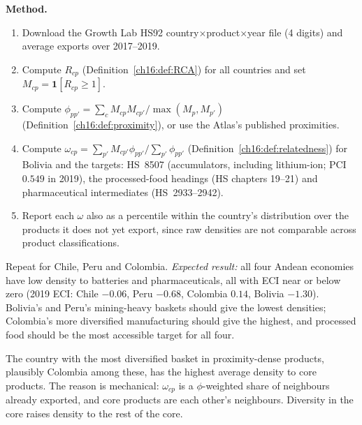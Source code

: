 \documentclass[../solutions_manual.tex]{subfiles}
\begin{document}
 \textbf{Method.}
\begin{enumerate}
\item Download the Growth Lab HS92 country$\times$product$\times$year file (4 digits) and average exports over 2017--2019.
\item Compute $R_{cp}$ (Definition~\ref{ch16:def:RCA}) for all countries and set $M_{cp} = \mathbf{1}[R_{cp} \ge 1]$.
\item Compute $\phi_{pp'} = \sum_c M_{cp}M_{cp'}/\max(M_p, M_{p'})$ (Definition~\ref{ch16:def:proximity}), or use the Atlas's published proximities.
\item Compute $\omega_{cp} = \sum_{p'}M_{cp'}\phi_{pp'}/\sum_{p'}\phi_{pp'}$ (Definition~\ref{ch16:def:relatedness}) for Bolivia and the targets: HS~8507 (accumulators, including lithium-ion; PCI $0.549$ in 2019), the processed-food headings (HS chapters 19--21) and pharmaceutical intermediates (HS~2933--2942).
\item Report each $\omega$ also as a percentile within the country's distribution over the products it does not yet export, since raw densities are not comparable across product classifications.
\end{enumerate}

 Repeat for Chile, Peru and Colombia. \emph{Expected result:} all four Andean economies have low density to batteries and pharmaceuticals, all with ECI near or below zero (2019 ECI: Chile $-0.06$, Peru $-0.68$, Colombia $0.14$, Bolivia $-1.30$). Bolivia's and Peru's mining-heavy baskets should give the lowest densities; Colombia's more diversified manufacturing should give the highest, and processed food should be the most accessible target for all four.

 The country with the most diversified basket in proximity-dense products, plausibly Colombia among these, has the highest average density to core products. The reason is mechanical: $\omega_{cp}$ is a $\phi$-weighted share of neighbours already exported, and core products are each other's neighbours. Diversity in the core raises density to the rest of the core.
\end{document}

